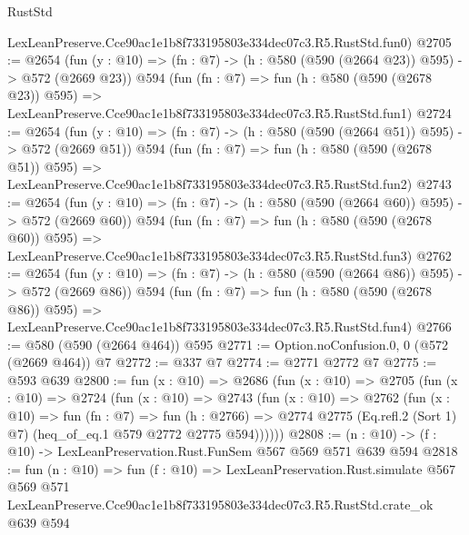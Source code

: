 \begin{lexlean}{RustStd}
\begin{coremodule}
    LexLeanPreserve.Cce90ac1e1b8f733195803e334dec07c3.R5.RustStd.fun0)
@2705 := @2654
    (fun (y : @10) => (fn : @7) -> (h : @580 (@590 (@2664 @23)) @595) -> @572 (@2669 @23))
    @594
    (fun (fn : @7) =>
    fun (h : @580 (@590 (@2678 @23)) @595) =>
    LexLeanPreserve.Cce90ac1e1b8f733195803e334dec07c3.R5.RustStd.fun1)
@2724 := @2654
    (fun (y : @10) => (fn : @7) -> (h : @580 (@590 (@2664 @51)) @595) -> @572 (@2669 @51))
    @594
    (fun (fn : @7) =>
    fun (h : @580 (@590 (@2678 @51)) @595) =>
    LexLeanPreserve.Cce90ac1e1b8f733195803e334dec07c3.R5.RustStd.fun2)
@2743 := @2654
    (fun (y : @10) => (fn : @7) -> (h : @580 (@590 (@2664 @60)) @595) -> @572 (@2669 @60))
    @594
    (fun (fn : @7) =>
    fun (h : @580 (@590 (@2678 @60)) @595) =>
    LexLeanPreserve.Cce90ac1e1b8f733195803e334dec07c3.R5.RustStd.fun3)
@2762 := @2654
    (fun (y : @10) => (fn : @7) -> (h : @580 (@590 (@2664 @86)) @595) -> @572 (@2669 @86))
    @594
    (fun (fn : @7) =>
    fun (h : @580 (@590 (@2678 @86)) @595) =>
    LexLeanPreserve.Cce90ac1e1b8f733195803e334dec07c3.R5.RustStd.fun4)
@2766 := @580 (@590 (@2664 @464)) @595
@2771 := Option.noConfusion.{0, 0} (@572 (@2669 @464)) @7
@2772 := @337 @7
@2774 := @2771 @2772 @7
@2775 := @593 @639
@2800 := fun (x : @10) =>
  @2686
    (fun (x : @10) =>
    @2705
      (fun (x : @10) =>
      @2724
        (fun (x : @10) =>
        @2743
          (fun (x : @10) =>
          @2762
            (fun (x : @10) =>
            fun (fn : @7) =>
            fun (h : @2766) =>
            @2774 @2775 (Eq.refl.{2} (Sort 1) @7) (heq_of_eq.{1} @579 @2772 @2775 @594))))))
@2808 := (n : @10) -> (f : @10) -> LexLeanPreservation.Rust.FunSem @567 @569 @571 @639 @594
@2818 := fun (n : @10) =>
  fun (f : @10) =>
  LexLeanPreservation.Rust.simulate
    @567
    @569
    @571
    LexLeanPreserve.Cce90ac1e1b8f733195803e334dec07c3.R5.RustStd.crate_ok
    @639
    @594
\end{coremodule}
\end{lexlean}
